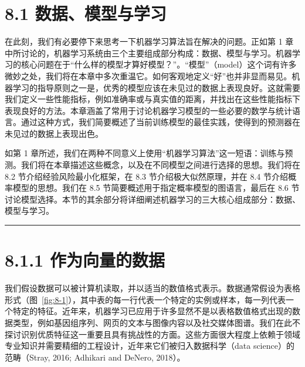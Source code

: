\section*{8.1 数据、模型与学习}
\label{sec:8.1}

在此刻，我们有必要停下来思考一下机器学习算法旨在解决的问题。正如第 1 章中所讨论的，机器学习系统由三个主要组成部分构成：数据、模型与学习。机器学习的核心问题在于“什么样的模型才算好模型？”。“模型”（model）这个词有许多微妙之处，我们将在本章中多次重温它。如何客观地定义“好”也并非显而易见。机器学习的指导原则之一是，优秀的模型应该在未见过的数据上表现良好。这就需要我们定义一些性能指标，例如准确率或与真实值的距离，并找出在这些性能指标下表现良好的方法。本章涵盖了常用于讨论机器学习模型的一些必要的数学与统计语言。通过这种方式，我们简要概述了当前训练模型的最佳实践，使得到的预测器在未见过的数据上表现出色。

如第 1 章所述，我们在两种不同意义上使用“机器学习算法”这一短语：训练与预测。我们将在本章描述这些概念，以及在不同模型之间进行选择的思想。我们将在 8.2 节介绍经验风险最小化框架，在 8.3 节介绍极大似然原理，并在 8.4 节介绍概率模型的思想。我们在 8.5 节简要概述用于指定概率模型的图语言，最后在 8.6 节讨论模型选择。本节的其余部分将详细阐述机器学习的三大核心组成部分：数据、模型与学习。

\medskip\hrule\medskip

\section*{8.1.1 作为向量的数据}

我们假设数据可以被计算机读取，并以适当的数值格式表示。数据通常假设为表格形式（图~\ref{fig:8-1}），其中表的每一行代表一个特定的实例或样本，每一列代表一个特定的特征。近年来，机器学习已应用于许多显然不是以表格数值格式出现的数据类型，例如基因组序列、网页的文本与图像内容以及社交媒体图谱。我们在此不探讨识别优质特征这一重要且具有挑战性的方面。这些方面很大程度上依赖于领域专业知识并需要精细的工程设计，近年来它们被归入数据科学（data science）的范畴（Stray, 2016; Adhikari and DeNero, 2018）。

